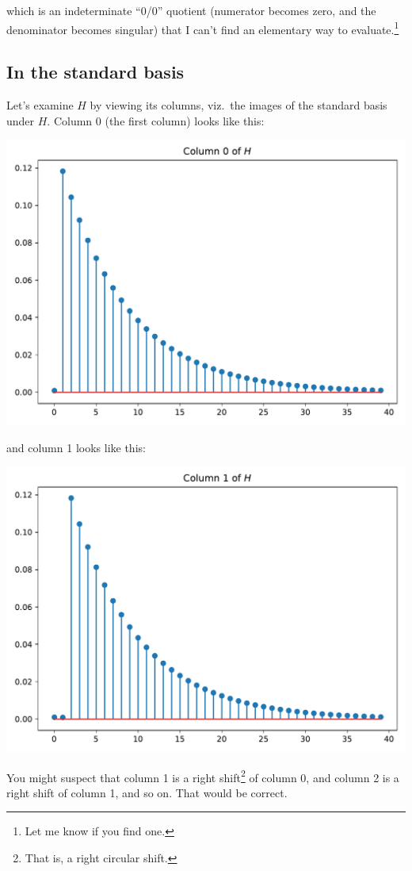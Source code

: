 which is an indeterminate ``0/0'' quotient (numerator becomes zero, and the denominator becomes singular) that I can't find an elementary way to evaluate.\footnote{Let me know if you find one.}

\subsection{In the standard basis}
Let's examine \(H\) by viewing its columns, viz.~the images of the standard basis under \(H\).
Column 0 (the first column) looks like this:
\begin{center}
  \includegraphics[width=0.618\linewidth]{27-figs/H-0}
\end{center}
and column 1 looks like this:
\begin{center}
  \includegraphics[width=0.618\linewidth]{27-figs/H-1}
\end{center}
You might suspect that column 1 is a right shift\footnote{That is, a right circular shift.} of column 0, and column 2 is a right shift of column 1, and so on.
That would be correct.

